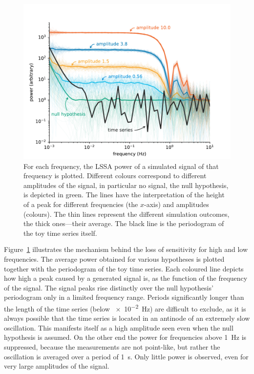 \begin{figure}
  \centering \includegraphics[width=\linewidth]{gfx/axions/basic_exclusion_sensitivity.pdf}
  \caption{For each frequency, the LSSA power of a simulated signal of that frequency is plotted. Different colours correspond to different amplitudes of the signal, in particular no signal, the null hypothesis, is depicted in green. The lines have the interpretation of the height of a peak for different frequencies (the $x$-axis) and amplitudes (colours). The thin lines represent the different simulation outcomes, the thick ones---their average. The black line is the periodogram of the toy time series itself.}\label{fig:sensitivity}
\end{figure}

Figure~\ref{fig:sensitivity} illustrates the mechanism behind the loss of sensitivity for high and low frequencies. The average power obtained for various hypotheses is plotted together with the periodogram of the toy time series. Each coloured line depicts how high a peak caused by a generated signal is, as the function of the frequency of the signal.
The signal peaks rise distinctly over the null hypothesis' periodogram only in a limited frequency range. Periods significantly longer than the length of the time series (below \SI{e-2}{\hertz}) are difficult to exclude, as it is always possible that the time series is located in an antinode of an extremely slow oscillation. This manifests itself as a high amplitude seen even when the null hypothesis is assumed. On the other end the power for frequencies above \SI{1}{\hertz} is suppressed, because the measurements are not point-like, but rather the oscillation is averaged over a period of \SI{1}{\second}. Only little power is observed, even for very large amplitudes of the signal.

